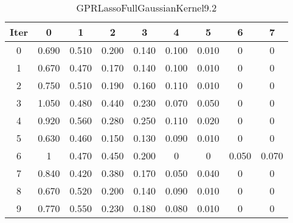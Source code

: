 \begin{table}
	\begin{center}
		\begin{tabular}{|c|c|c|c|c|c|c|c|c|}
			\hline
			Iter & 0 & 1 & 2 & 3 & 4 & 5 & 6 & 7 \\
			\hline
			0 & 0.690 & 0.510 & 0.200 & 0.140 & 0.100 & 0.010 & 0 & 0 \\
			\hline
			1 & 0.670 & 0.470 & 0.170 & 0.140 & 0.100 & 0.010 & 0 & 0 \\
			\hline
			2 & 0.750 & 0.510 & 0.190 & 0.160 & 0.110 & 0.010 & 0 & 0 \\
			\hline
			3 & 1.050 & 0.480 & 0.440 & 0.230 & 0.070 & 0.050 & 0 & 0 \\
			\hline
			4 & 0.920 & 0.560 & 0.280 & 0.250 & 0.110 & 0.020 & 0 & 0 \\
			\hline
			5 & 0.630 & 0.460 & 0.150 & 0.130 & 0.090 & 0.010 & 0 & 0 \\
			\hline
			6 & 1 & 0.470 & 0.450 & 0.200 & 0 & 0 & 0.050 & 0.070 \\
			\hline
			7 & 0.840 & 0.420 & 0.380 & 0.170 & 0.050 & 0.040 & 0 & 0 \\
			\hline
			8 & 0.670 & 0.520 & 0.200 & 0.140 & 0.090 & 0.010 & 0 & 0 \\
			\hline
			9 & 0.770 & 0.550 & 0.230 & 0.180 & 0.080 & 0.010 & 0 & 0 \\
			\hline
		\end{tabular}
	\end{center}
	\caption{GPRLassoFullGaussianKernel9.2}
\end{table}